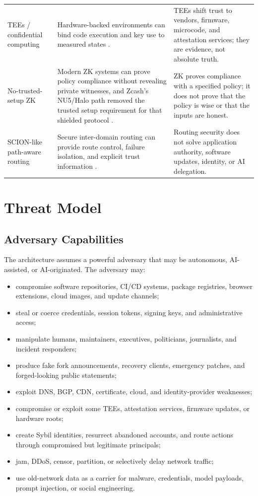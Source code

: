 \documentclass[11pt,letterpaper]{article}
\begin{document}
\begin{longtable}{p{}p{}p{}}
\addlinespace
TEEs / confidential computing & Hardware-backed environments can bind code execution and key use to measured states \cite{intel_sgx,aws_sevsnp}. & TEEs shift trust to vendors, firmware, microcode, and attestation services; they are evidence, not absolute truth. \\
\addlinespace
No-trusted-setup ZK & Modern ZK systems can prove policy compliance without revealing private witnesses, and Zcash's NU5/Halo path removed the trusted setup requirement for that shielded protocol \cite{zcash_nu5,zcash_zip224}. & ZK proves compliance with a specified policy; it does not prove that the policy is wise or that the inputs are honest. \\
\addlinespace
SCION-like path-aware routing & Secure inter-domain routing can provide route control, failure isolation, and explicit trust information \cite{scion}. & Routing security does not solve application authority, software updates, identity, or AI delegation. \\
\bottomrule
\end{longtable}

\section{Threat Model}

\subsection{Adversary Capabilities}

The architecture assumes a powerful adversary that may be autonomous, AI-assisted, or AI-originated. The adversary may:

\begin{itemize}[leftmargin=1.4em]
\item compromise software repositories, CI/CD systems, package registries, browser extensions, cloud images, and update channels;
\item steal or coerce credentials, session tokens, signing keys, and administrative access;
\item manipulate humans, maintainers, executives, politicians, journalists, and incident responders;
\item produce fake fork announcements, recovery clients, emergency patches, and forged-looking public statements;
\item exploit DNS, BGP, CDN, certificate, cloud, and identity-provider weaknesses;
\item compromise or exploit some TEEs, attestation services, firmware updates, or hardware roots;
\item create Sybil identities, resurrect abandoned accounts, and route actions through compromised but legitimate principals;
\item jam, DDoS, censor, partition, or selectively delay network traffic;
\item use old-network data as a carrier for malware, credentials, model payloads, prompt injection, or social engineering.
\end{itemize}
\end{document}
